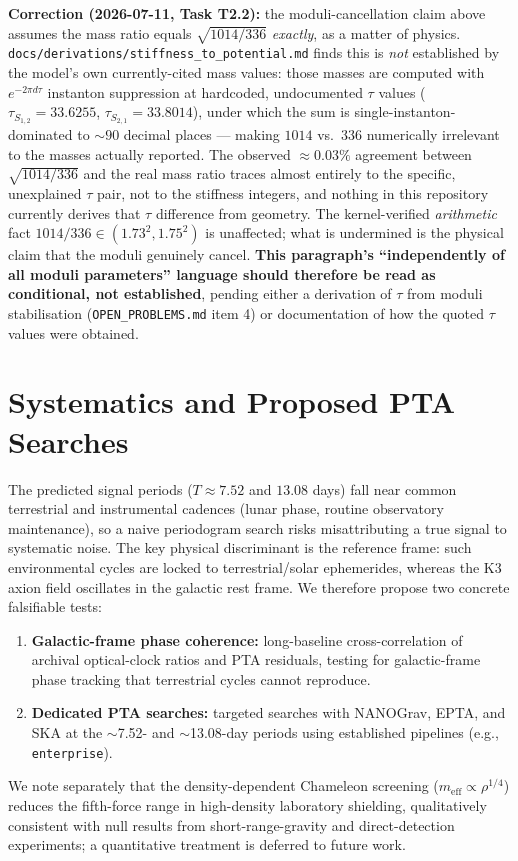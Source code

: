 \documentclass[11pt,a4paper]{article}
\begin{document}
\textbf{Correction (2026-07-11, Task T2.2):} the moduli-cancellation claim above assumes the mass ratio equals $\sqrt{1014/336}$ \emph{exactly}, as a matter of physics. \texttt{docs/derivations/stiffness\_to\_potential.md} finds this is \emph{not} established by the model's own currently-cited mass values: those masses are computed with $e^{-2\pi d\tau}$ instanton suppression at hardcoded, undocumented $\tau$ values ($\tau_{S_{1,2}}=33.6255$, $\tau_{S_{2,1}}=33.8014$), under which the sum is single-instanton-dominated to $\sim90$ decimal places — making $1014$ vs.\ $336$ numerically irrelevant to the masses actually reported. The observed $\approx0.03\%$ agreement between $\sqrt{1014/336}$ and the real mass ratio traces almost entirely to the specific, unexplained $\tau$ pair, not to the stiffness integers, and nothing in this repository currently derives that $\tau$ difference from geometry. The kernel-verified \emph{arithmetic} fact $1014/336\in(1.73^2,1.75^2)$ is unaffected; what is undermined is the physical claim that the moduli genuinely cancel. \textbf{This paragraph's ``independently of all moduli parameters'' language should therefore be read as conditional, not established}, pending either a derivation of $\tau$ from moduli stabilisation (\texttt{OPEN\_PROBLEMS.md} item 4) or documentation of how the quoted $\tau$ values were obtained.

\section{Systematics and Proposed PTA Searches}
The predicted signal periods ($T \approx 7.52$ and $13.08$ days) fall near common terrestrial and instrumental cadences (lunar phase, routine observatory maintenance), so a naive periodogram search risks misattributing a true signal to systematic noise. The key physical discriminant is the reference frame: such environmental cycles are locked to terrestrial/solar ephemerides, whereas the K3 axion field oscillates in the galactic rest frame. We therefore propose two concrete falsifiable tests:
\begin{enumerate}
    \item \textbf{Galactic-frame phase coherence:} long-baseline cross-correlation of archival optical-clock ratios and PTA residuals, testing for galactic-frame phase tracking that terrestrial cycles cannot reproduce.
    \item \textbf{Dedicated PTA searches:} targeted searches with NANOGrav, EPTA, and SKA at the $\sim$7.52- and $\sim$13.08-day periods using established pipelines (e.g., \texttt{enterprise}).
\end{enumerate}
We note separately that the density-dependent Chameleon screening ($m_\mathrm{eff}\propto\rho^{1/4}$) reduces the fifth-force range in high-density laboratory shielding, qualitatively consistent with null results from short-range-gravity and direct-detection experiments; a quantitative treatment is deferred to future work.
\end{document}
